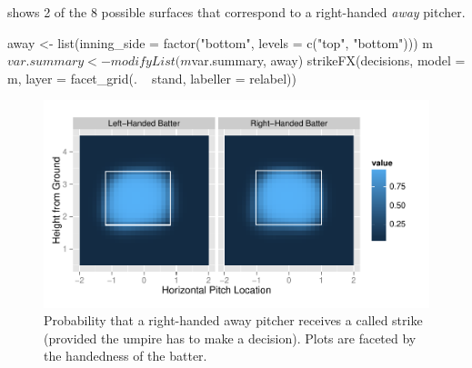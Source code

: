 \begin{article}
shows 2 of the 8 possible surfaces that correspond to a right-handed
\emph{away} pitcher.
%
\begin{Schunk}
\begin{Sinput}
away <- list(inning_side = factor("bottom", levels = c("top", "bottom")))
m$var.summary <- modifyList(m$var.summary, away)
strikeFX(decisions, model = m, layer = facet_grid(. ~ stand, labeller = relabel))
\end{Sinput}
\end{Schunk}
%
\begin{figure}[h]
\centerline{\includegraphics[scale = 1]{prob-strike.pdf}}

\caption{\label{fig:strike-probs}Probability that a right-handed away pitcher
receives a called strike (provided the umpire has to make a decision).
Plots are faceted by the handedness of the batter.}
\end{figure}



\end{article}
